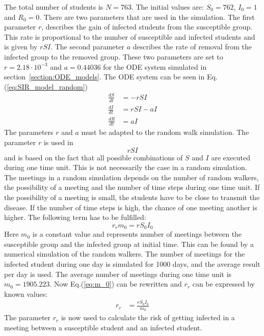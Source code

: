 \documentclass[%
twoside,                 %
final,                   %
chapterprefix=true,      %
open=right               %
10pt]{book}
\begin{document}
\noindent
The total number of students is $N=763$. The initial values are: $S_0=762$, $I_0=1$ and $R_0=0$. There are two parameters that are used in the simulation. The first parameter $r$, describes the gain of infected students from the susceptible group. This rate is proportional to the number of susceptible and infected students and is given by $rSI$. The second parameter $a$ describes the rate of removal from the infected group to the removed group. These two parameters are set to $r=2.18\cdot 10^{-3}$ and $a=0.44036$ for the ODE system simulated in section~\ref{section:ODE_models}. The ODE system can be seen in Eq.(\ref{eq:SIR_model_random})
\begin{equation} \label{eq:SIR_model_random}
	\begin{aligned} 
	\frac{dS}{dt} &= -rSI \\ 
	\frac{dI}{dt} &= rSI-aI \\ 
	\frac{dR}{dt} &= aI 
	\end{aligned}
\end{equation}
The parameters $r$ and $a$ must be adapted to the random walk simulation. The parameter $r$ is used in
\begin{equation} \label{eq:rSI}
rSI
\end{equation}
and is based on the fact that all possible combinations of $S$ and $I$ are executed during one time unit. This is not necessarily the case in a random simulation. The meetings in a random simulation depends on the number of random walkers, the possibility of a meeting and the number of time steps during one time unit. If the possibility of a meeting is small, the students have to be close to transmit the disease. If the number of time steps is high, the chance of one meeting another is higher. The following term has to be fulfilled: 
\begin{equation} \label{eq:m_0}
r_r m_0 = rS_0I_0
\end{equation}
Here $m_0$ is a constant value and represents number of meetings between the susceptible group and the infected group at initial time. This can be found by a numerical simulation of the random walkers. The number of meetings for the infected student during one day is simulated for 1000 days, and the average result per day is used. The average number of meetings during one time unit is $m_0=1905.223$. Now Eq.(\ref{eq:m_0}) can be rewritten and $r_r$ can be expressed by known values: 
\begin{equation} \label{eq:m_0_2}
	\begin{aligned} 
	r_r &= \frac{rS_0I_0}{m_0}
	\end{aligned}
\end{equation}
The parameter $r_r$ is now used to calculate the risk of getting infected in a meeting between a susceptible student and an infected student. 
\end{document}
